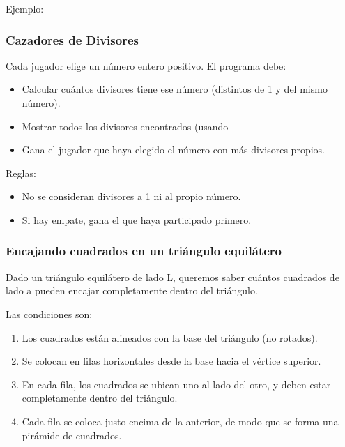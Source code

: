 Ejemplo:

{\small
  \lstset{inputencoding=utf8/latin1}
  
}

\subsubsection{Cazadores de Divisores}

Cada jugador elige un número entero positivo. El programa debe:

\begin{itemize}
  \item Calcular cuántos divisores tiene ese número (distintos de 1 y del mismo número).
  \item Mostrar todos los divisores encontrados (usando %
  \item Gana el jugador que haya elegido el número con más divisores propios.
\end{itemize}

Reglas:

\begin{itemize}
  \item No se consideran divisores a 1 ni al propio número.
  \item Si hay empate, gana el que haya participado primero.
\end{itemize}

\subsubsection{Encajando cuadrados en un triángulo equilátero}

Dado un triángulo equilátero de lado L, queremos saber cuántos cuadrados de lado a pueden encajar completamente dentro del triángulo.

Las condiciones son:

\begin{enumerate}
  \item Los cuadrados están alineados con la base del triángulo (no rotados).
  \item Se colocan en filas horizontales desde la base hacia el vértice superior.
  \item En cada fila, los cuadrados se ubican uno al lado del otro, y deben estar completamente dentro del triángulo.
  \item Cada fila se coloca justo encima de la anterior, de modo que se forma una pirámide de cuadrados.
\end{enumerate}

